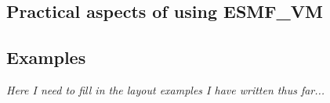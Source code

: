 
\subsection{Practical aspects of using ESMF\_VM}

\subsection{Examples}
{\em Here I need to fill in the layout examples I have written thus far...}
